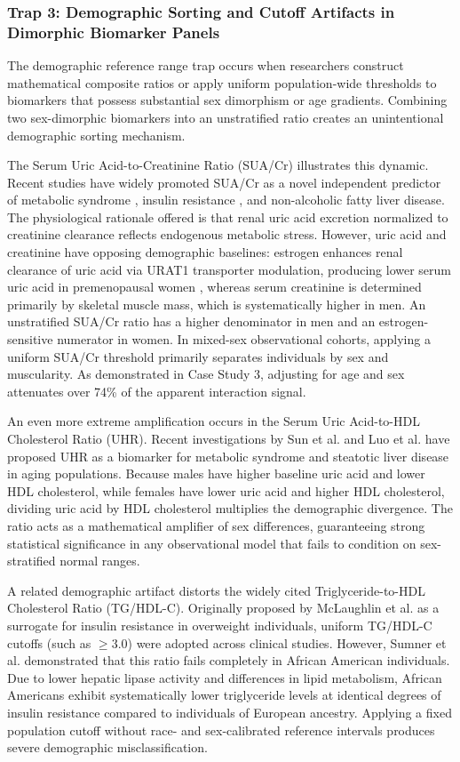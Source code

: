 \documentclass[10pt,letterpaper]{article}
\begin{document}
\subsubsection{Trap 3: Demographic Sorting and Cutoff Artifacts in Dimorphic Biomarker Panels}
The demographic reference range trap occurs when researchers construct mathematical composite ratios or apply uniform population-wide thresholds to biomarkers that possess substantial sex dimorphism or age gradients. Combining two sex-dimorphic biomarkers into an unstratified ratio creates an unintentional demographic sorting mechanism.

The Serum Uric Acid-to-Creatinine Ratio (SUA/Cr) illustrates this dynamic. Recent studies have widely promoted SUA/Cr as a novel independent predictor of metabolic syndrome \cite{kawamoto2019, chen2024}, insulin resistance \cite{oh2025}, and non-alcoholic fatty liver disease. The physiological rationale offered is that renal uric acid excretion normalized to creatinine clearance reflects endogenous metabolic stress. However, uric acid and creatinine have opposing demographic baselines: estrogen enhances renal clearance of uric acid via URAT1 transporter modulation, producing lower serum uric acid in premenopausal women \cite{hak2008, sumino1999}, whereas serum creatinine is determined primarily by skeletal muscle mass, which is systematically higher in men. An unstratified SUA/Cr ratio has a higher denominator in men and an estrogen-sensitive numerator in women. In mixed-sex observational cohorts, applying a uniform SUA/Cr threshold primarily separates individuals by sex and muscularity. As demonstrated in Case Study 3, adjusting for age and sex attenuates over 74\% of the apparent interaction signal.

An even more extreme amplification occurs in the Serum Uric Acid-to-HDL Cholesterol Ratio (UHR). Recent investigations by Sun et al. \cite{sun2026} and Luo et al. \cite{luo2026} have proposed UHR as a biomarker for metabolic syndrome and steatotic liver disease in aging populations. Because males have higher baseline uric acid and lower HDL cholesterol, while females have lower uric acid and higher HDL cholesterol, dividing uric acid by HDL cholesterol multiplies the demographic divergence. The ratio acts as a mathematical amplifier of sex differences, guaranteeing strong statistical significance in any observational model that fails to condition on sex-stratified normal ranges.

A related demographic artifact distorts the widely cited Triglyceride-to-HDL Cholesterol Ratio (TG/HDL-C). Originally proposed by McLaughlin et al. \cite{mclaughlin2003} as a surrogate for insulin resistance in overweight individuals, uniform TG/HDL-C cutoffs (such as $\ge 3.0$) were adopted across clinical studies. However, Sumner et al. \cite{sumner2005} demonstrated that this ratio fails completely in African American individuals. Due to lower hepatic lipase activity and differences in lipid metabolism, African Americans exhibit systematically lower triglyceride levels at identical degrees of insulin resistance compared to individuals of European ancestry. Applying a fixed population cutoff without race- and sex-calibrated reference intervals produces severe demographic misclassification.
\end{document}
